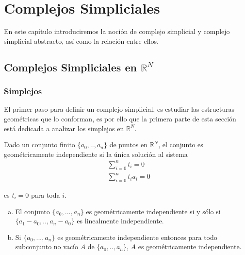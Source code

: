 \chapter{Complejos Simpliciales}
En este capítulo introduciremos la noción de complejo simplicial y complejo simplicial abstracto, así como la relación entre ellos.
\section{Complejos Simpliciales en $\mathbb{R}^N$}
\subsection{Simplejos}  
El primer paso para definir un complejo simplicial, es estudiar las estructuras geométricas que lo conforman, es por ello que la primera parte de esta sección está dedicada a analizar los simplejos en $\mathbb{R}^N$.           
\begin{Defi}
Dado un conjunto finito $\{a_0,..,a_n\}$ de puntos en $\mathbb{R}^{N}$, el conjunto es geométricamente independiente si la única solución al sistema 
\begin{equation}\label{s1}
    \begin{split}
     &\sum_{i=0}^{n}t_{i} = 0 \\
     &\sum_{i=0}^{n}t_{i}a_{i} = 0   
    \end{split}
\end{equation}

es $t_i = 0$ para toda $i$.
\end{Defi}

\begin{Teo}
\hspace{1cm}
\begin{enumerate}[(a)]
    \item El conjunto $\{a_0,...,a_n\}$ es geométricamente independiente si y sólo si $\{a_1-a_0,..,a_n-a_0\}$ es linealmente independiente.
    \item Si $\{a_0,...,a_n\}$ es geométricamente independiente entonces para todo subconjunto no vacío $A$ de $\{a_0,..,a_n\}$, $A$ es geométricamente independiente.
\end{enumerate}
\end{Teo}

